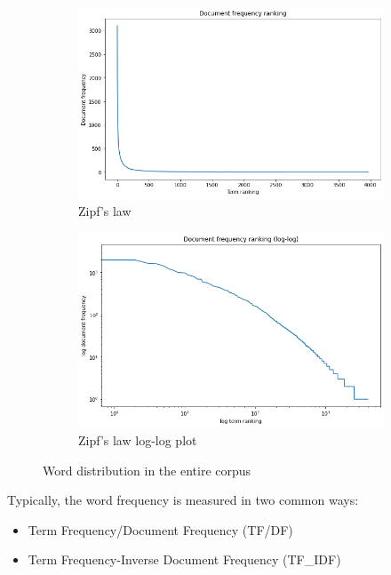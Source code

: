 \documentclass[11pt, letterpaper]{article}
\begin{document}
\begin{figure}[H]%
     \centering
     \begin{subfigure}[b]{0.45\textwidth}
         \centering
         \includegraphics[width=\textwidth]{zipf_law.png}
         \caption{Zipf's law}
         \label{fig:zipflawa}
     \end{subfigure}
     \hfill
     \begin{subfigure}[b]{0.45\textwidth}
         \centering
         \includegraphics[width=\textwidth]{zipf_log_log.png}
         \caption{Zipf's law log-log plot}
         \label{fig:zipflawloglog}
     \end{subfigure}
        \caption{Word distribution in the entire corpus}
        \label{fig:zipflaw}
\end{figure}
Typically, the word frequency is measured in two common ways:
\begin{itemize}
    \item Term Frequency/Document Frequency (TF/DF)
    \item Term Frequency-Inverse Document Frequency (TF\_IDF)
\end{itemize}
\end{document}
